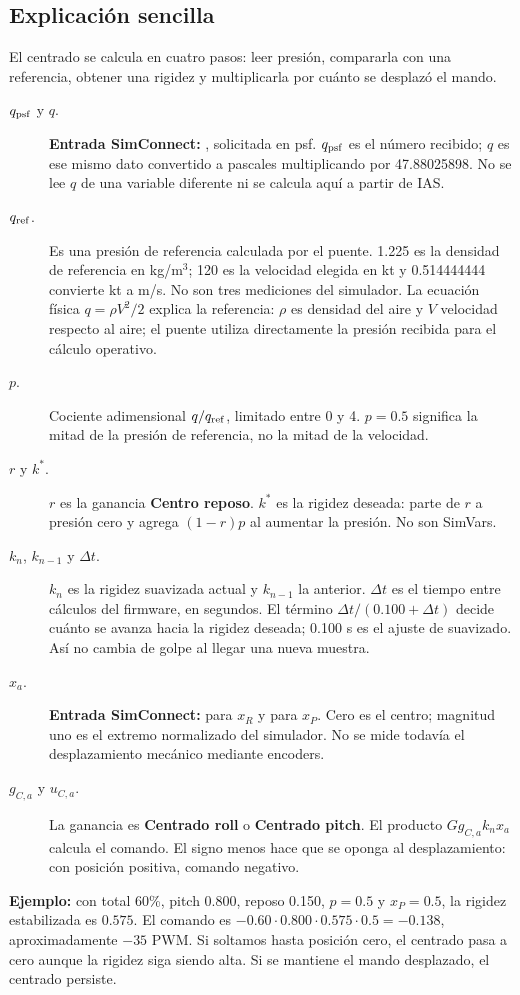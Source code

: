 \documentclass[11pt,a4paper]{article}
\newcommand{\code}[1]{\texttt{\detokenize{#1}}}
\begin{document}
\subsection{Explicación sencilla}
El centrado se calcula en cuatro pasos: leer presión, compararla con una referencia, obtener una rigidez y multiplicarla por cuánto se desplazó el mando.
\begin{description}
\item[$q_{\rm psf}$ y $q$.] \textbf{Entrada SimConnect:} \code{DYNAMIC PRESSURE}, solicitada en psf. $q_{\rm psf}$ es el número recibido; $q$ es ese mismo dato convertido a pascales multiplicando por 47.88025898. No se lee $q$ de una variable diferente ni se calcula aquí a partir de IAS.
\item[$q_{\rm ref}$.] Es una presión de referencia calculada por el puente. 1.225 es la densidad de referencia en kg/m$^3$; 120 es la velocidad elegida en kt y 0.514444444 convierte kt a m/s. No son tres mediciones del simulador. La ecuación física $q=\rho V^2/2$ explica la referencia: $\rho$ es densidad del aire y $V$ velocidad respecto al aire; el puente utiliza directamente la presión recibida para el cálculo operativo.
\item[$p$.] Cociente adimensional $q/q_{\rm ref}$, limitado entre 0 y 4. $p=0.5$ significa la mitad de la presión de referencia, no la mitad de la velocidad.
\item[$r$ y $k^*$.] $r$ es la ganancia \textbf{Centro reposo}. $k^*$ es la rigidez deseada: parte de $r$ a presión cero y agrega $(1-r)p$ al aumentar la presión. No son SimVars.
\item[$k_n$, $k_{n-1}$ y $\Delta t$.] $k_n$ es la rigidez suavizada actual y $k_{n-1}$ la anterior. $\Delta t$ es el tiempo entre cálculos del firmware, en segundos. El término $\Delta t/(0.100+\Delta t)$ decide cuánto se avanza hacia la rigidez deseada; 0.100 s es el ajuste de suavizado. Así no cambia de golpe al llegar una nueva muestra.
\item[$x_a$.] \textbf{Entrada SimConnect:} \code{YOKE X POSITION} para $x_R$ y \code{YOKE Y POSITION} para $x_P$. Cero es el centro; magnitud uno es el extremo normalizado del simulador. No se mide todavía el desplazamiento mecánico mediante encoders.
\item[$g_{C,a}$ y $u_{C,a}$.] La ganancia es \textbf{Centrado roll} o \textbf{Centrado pitch}. El producto $Gg_{C,a}k_nx_a$ calcula el comando. El signo menos hace que se oponga al desplazamiento: con posición positiva, comando negativo.
\end{description}
\textbf{Ejemplo:} con total 60\%, pitch 0.800, reposo 0.150, $p=0.5$ y $x_P=0.5$, la rigidez estabilizada es $0.575$. El comando es $-0.60\cdot0.800\cdot0.575\cdot0.5=-0.138$, aproximadamente $-35$ PWM. Si soltamos hasta posición cero, el centrado pasa a cero aunque la rigidez siga siendo alta. Si se mantiene el mando desplazado, el centrado persiste.
\end{document}
